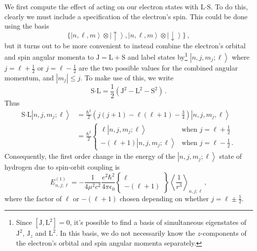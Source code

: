 \documentclass{article}
\theoremstyle{plain}\theoremheaderfont{\normalfont\itshape}\theorembodyfont{\rmfamily}\theoremseparator{.}\newtheorem*{rem}{Remark}\newtheorem*{ex}{Example}\newtheorem*{proof}{Proof}\newtheorem*{altp}{Alternative proof}
\theoremstyle{plain}\theoremheaderfont{\normalfont\bfseries}\theorembodyfont{\rmfamily}\theoremseparator{.}\newtheorem{thm}{Theorem}[section]\newtheorem{lem}[thm]{Lemma}\newtheorem{prop}[thm]{Proposition}\newtheorem*{cor}{Corollary}\newtheorem{defn}[thm]{Definition}\newtheorem{clm}[thm]{Claim}\newtheorem{clminproof}{Claim}
\theoremstyle{break}\theoremheaderfont{\normalfont\itshape}\theorembodyfont{\rmfamily}\theoremseparator{.\medskip}\newtheorem*{proofskip}{Proof}\newtheorem*{exs}{Examples}\newtheorem*{rems}{Remarks}
\theoremstyle{break}\theoremheaderfont{\normalfont\bfseries}\theorembodyfont{\rmfamily}\theoremseparator{.\medskip}\newtheorem{lemskip}[thm]{Lemma}\newtheorem{defnskip}[thm]{Definition}\newtheorem{propskip}[thm]{Proposition}\newtheorem{thmskip}[thm]{Theorem}
\numberwithin{equation}{section}
\newcommand{\ket}[1]{\left| #1 \right\rangle}
\newcommand{\eval}[1]{\left\langle #1 \right\rangle}
\newcommand{\vb}[1]{\bm{\mathrm{#1}}}
\newcommand{\vdot}{\bm{\cdot}}
\newcommand{\abs}[1]{\left| #1 \right|}
\begin{document}
    We first compute the effect of acting on our electron states with \(\vb{L}\vdot\vb{S}\). To do this, clearly we must include a specification of the electron's spin. This could be done using the basis
    \begin{equation}
        \{\ket{n,\ell,m}\otimes\ket{\uparrow},\ket{n,\ell,m}\otimes\ket{\downarrow}\}\,,
    \end{equation}
    but it turns out to be more convenient to instead combine the electron's orbital and spin angular momenta to \(\vb{J}=\vb{L}+\vb{S}\) and label states by\footnote{Since \([\vb{J},\vb{L}^2]=0\), it's possible to find a basis of simultaneous eigenstates of \(\vb{J}^2\), \(\vb{J}_z\) and \(\vb{L}^2\). In this basis, we do not necessarily know the \(z\)-components of the electron's orbital and spin angular momenta separately.} \(\ket{n,j,m_j;\ell}\) where \(j=\ell+\frac{1}{2}\) or \(j=\ell-\frac{1}{2}\) are the two possible values for the combined angular momentum, and \(\abs{m_j}\le j\). To make use of this, we write
    \begin{equation}
        \vb{S}\vdot\vb{L}=\frac{1}{2}(\vb{J}^2-\vb{L}^2-\vb{S}^2)\,.
    \end{equation}
    Thus
    \begin{align}
        \vb{S}\vdot\vb{L}\ket{n,j,m_j;\ell}&=\frac{\hbar^2}{2}\left(j(j+1)-\ell(\ell+1)-\frac{3}{4}\right)\ket{n,j,m_j,\ell}\\
        &=\frac{\hbar^2}{2}\begin{cases}
            \ell\ket{n,j,m_j;\ell} & \text{when }j=\ell+\frac{1}{2}\\
            -(\ell+1)\ket{n,j,m_j;\ell} & \text{when }j=\ell-\frac{1}{2}\,.
        \end{cases}
    \end{align}
    Consequently, the first order change in the energy of the \(\ket{n,j,m_j;\ell}\) state of hydrogen due to spin-orbit coupling is
    \begin{equation}
        E_{n,j;\ell}^{(1)}=-\frac{1}{4\mu^2 c^2}\frac{e^2\hbar^2}{4\pi\epsilon_0}\left\{\begin{matrix}
            \ell \\ -(\ell+1)
        \end{matrix}\right\}\eval{\frac{1}{r^3}}_{n,j;\ell}\,,
    \end{equation}
    where the factor of \(\ell\) or \(-(\ell+1)\) chosen depending on whether \(j=\ell\pm\frac{1}{2}\).
\end{document}
